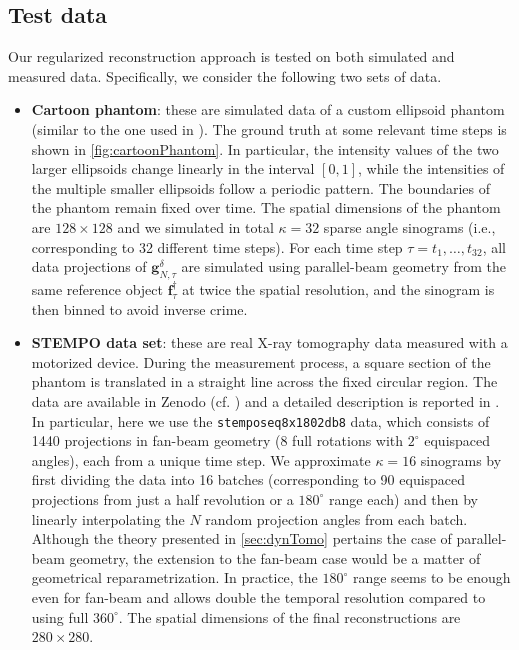 \documentclass[11pt,a4paper]{article}
\numberwithin{equation}{section}
\renewcommand{\vec}[1]{\boldsymbol{#1}} %
\newcommand{\f}{\vec{f}} %
\newcommand{\g}{\vec{g}} %
\begin{document}
\subsection{Test data} \label{ssec:numericalSetup}
Our regularized reconstruction approach is tested on both simulated and measured data. Specifically, we consider the following two sets of data.
\begin{itemize}
\item {\bf Cartoon phantom}: these are simulated data of a custom ellipsoid phantom (similar to the one used in \cite{bubba2023efficient}). The ground truth at some relevant time steps is shown in \cref{fig:cartoonPhantom}. In particular, the intensity values of the two larger ellipsoids change linearly in the interval $[0, 1]$, while the intensities of the multiple smaller ellipsoids follow a periodic pattern. The boundaries of the phantom remain fixed over time. 
    The spatial dimensions of the phantom are $128 \times 128$ and we simulated in total $\kappa = 32$ sparse angle sinograms (i.e., corresponding to 32 different time steps). For each time step $\tau =t_1, \ldots, t_{32}$, all data projections of $\g^{\delta}_{N,\tau}$ are simulated using parallel-beam geometry from the same reference object $\f_{\tau}^\dagger$ at twice the spatial resolution, and the sinogram is then binned to avoid inverse crime. 
    
\item {\bf STEMPO data set}: these are real X-ray tomography data measured with a motorized device. During the measurement process, a square section of the phantom is translated in a straight line across the fixed circular region. The data are available in Zenodo (cf. \cite{heikkila2022stempoData}) and a detailed description is reported in \cite{heikkila2022stempoDoc}. In particular, here we use the \texttt{stempo\textunderscore seq8x180\textunderscore 2d\textunderscore b8} data, which consists of 1440 projections in fan-beam geometry (8 full rotations with $2^\circ$ equispaced angles), each from a unique time step. We approximate $\kappa = 16$ sinograms by first dividing the data into 16 batches (corresponding to 90 equispaced projections from just a half revolution or a $180^\circ$ range each) and then by linearly interpolating the $N$ random projection angles from each batch. Although the theory presented in \cref{sec:dynTomo} pertains the case of parallel-beam geometry, the extension to the fan-beam case would be a matter of geometrical reparametrization. In practice, the $180^\circ$ range seems to be enough even for fan-beam and allows double the temporal resolution compared to using full $360^\circ$.
The spatial dimensions of the final reconstructions are $280 \times 280$.
    

\end{itemize}
\end{document}
